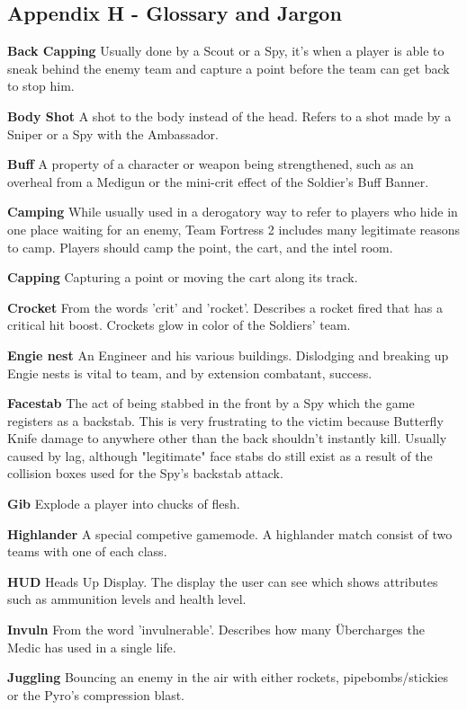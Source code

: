 \subsection{Appendix H - Glossary and Jargon}

{\bf Back Capping} Usually done by a Scout or a Spy, it’s when a player is able to sneak behind the enemy team and capture a point before the team can get back to stop him.

{\bf Body Shot} A shot to the body instead of the head. Refers to a shot made by a Sniper or a Spy with the Ambassador. 

{\bf Buff} A property of a character or weapon being strengthened, such as an overheal from a Medigun or the mini-crit effect of the Soldier's Buff Banner.

{\bf Camping} While usually used in a derogatory way to refer to players who hide in one place waiting for an enemy, Team Fortress 2 includes many legitimate reasons to camp. Players should camp the point, the cart, and the intel room.

{\bf Capping} Capturing a point or moving the cart along its track.

{\bf Crocket} From the words 'crit' and 'rocket'. Describes a rocket fired that has a critical hit boost. Crockets glow in color of the Soldiers' team.

{\bf Engie nest} An Engineer and his various buildings. Dislodging and breaking up Engie nests is vital to team, and by extension combatant, success. 

{\bf Facestab} The act of being stabbed in the front by a Spy which the game registers as a backstab. This is very frustrating to the victim because Butterfly Knife damage to anywhere other than the back shouldn't instantly kill. Usually caused by lag, although "legitimate" face stabs do still exist as a result of the collision boxes used for the Spy's backstab attack. 

{\bf Gib} Explode a player into chucks of flesh.

{\bf Highlander} A special competive gamemode. A highlander match consist of two teams with one of each class.

{\bf HUD} Heads Up Display. The display the user can see which shows attributes such as ammunition levels and health level.

{\bf Invuln} From the word 'invulnerable'. Describes how many Übercharges the Medic has used in a single life.  

{\bf Juggling} Bouncing an enemy in the air with either rockets, pipebombs/stickies or the Pyro's compression blast.

